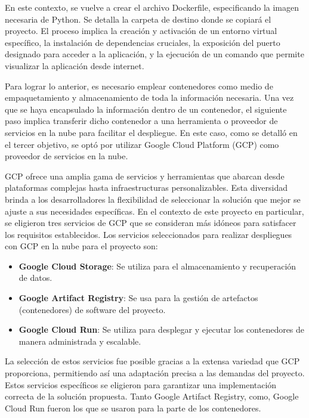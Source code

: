 \newpage

En este contexto, se vuelve a crear el archivo Dockerfile, especificando la imagen necesaria de Python. Se detalla la carpeta de destino donde se copiará el proyecto. El proceso implica la creación y activación de un entorno virtual específico, la instalación de dependencias cruciales, la exposición del puerto designado para acceder a la aplicación, y la ejecución de un comando que permite visualizar la aplicación desde internet. \newline

Para lograr lo anterior, es necesario emplear contenedores como medio de empaquetamiento y almacenamiento de toda la información necesaria. Una vez que se haya encapsulado la información dentro de un contenedor, el siguiente paso implica transferir dicho contenedor a una herramienta o proveedor de servicios en la nube para facilitar el despliegue. En este caso, como se detalló en el tercer objetivo, se optó por utilizar Google Cloud Platform (GCP) como proveedor de servicios en la nube. \newline

GCP ofrece una amplia gama de servicios y herramientas que abarcan desde plataformas complejas hasta infraestructuras personalizables. Esta diversidad brinda a los desarrolladores la flexibilidad de seleccionar la solución que mejor se ajuste a sus necesidades específicas. En el contexto de este proyecto en particular, se eligieron tres servicios de GCP que se consideran más idóneos para satisfacer los requisitos establecidos. Los servicios seleccionados para realizar despliegues con GCP en la nube para el proyecto son:

\begin{itemize}
	\item \textbf{Google Cloud Storage}: Se utiliza para el almacenamiento y recuperación de datos.
	\item \textbf{Google Artifact Registry}: Se usa para la gestión de artefactos (contenedores) de software del proyecto.
	\item \textbf{Google Cloud Run}: Se utiliza para desplegar y ejecutar los contenedores de manera administrada y escalable.
\end{itemize}

\newpage

La selección de estos servicios fue posible gracias a la extensa variedad que GCP proporciona, permitiendo así una adaptación precisa a las demandas del proyecto. Estos servicios específicos se eligieron para garantizar una implementación correcta de la solución propuesta. Tanto Google Artifact Registry, como, Google Cloud Run fueron los que se usaron para la parte de los contenedores. \newline


